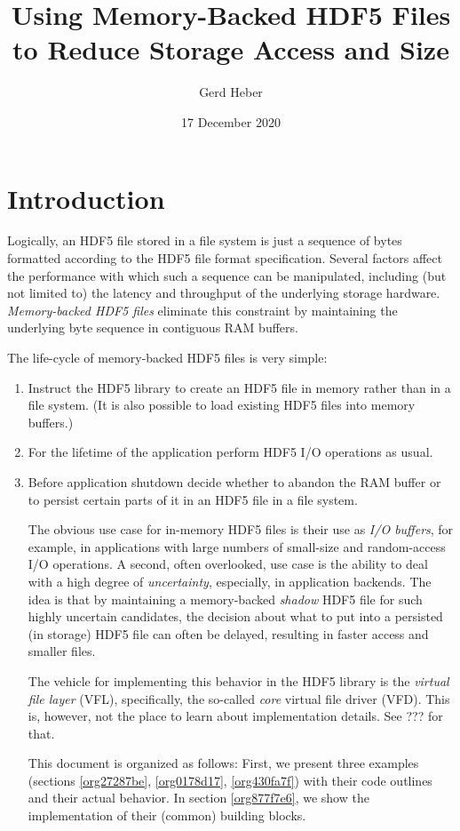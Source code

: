 \documentclass[a4paper, 12pt]{article}
\author{Gerd Heber}
\date{17 December 2020}
\title{Using Memory-Backed HDF5 Files to Reduce Storage Access and Size}
\begin{document}
\maketitle
\tableofcontents


\section{Introduction}
\label{sec:org0eadc57}

Logically, an HDF5 file stored in a file system is just a sequence of bytes
formatted according to the HDF5 file format specification. Several factors
affect the performance with which such a sequence can be manipulated,
including (but not limited to) the latency and throughput of the underlying
storage hardware. \emph{Memory-backed HDF5 files} eliminate this constraint by
maintaining the underlying byte sequence in contiguous RAM buffers.

The life-cycle of memory-backed HDF5 files is very simple:

\begin{enumerate}
\item Instruct the HDF5 library to create an HDF5 file in memory rather than in
a file system. (It is also possible to load existing HDF5 files into
memory buffers.)
\item For the lifetime of the application perform HDF5 I/O operations as usual.
\item Before application shutdown decide whether to abandon the RAM buffer or to
persist certain parts of it in an HDF5 file in a file system.

The obvious use case for in-memory HDF5 files is their use as \emph{I/O buffers},
for example, in applications with large numbers of small-size and
random-access I/O operations. A second, often overlooked, use case is the
ability to deal with a high degree of \emph{uncertainty}, especially, in
application backends. The idea is that by maintaining a memory-backed
\emph{shadow} HDF5 file for such highly uncertain candidates, the decision about
what to put into a persisted (in storage) HDF5 file can often be delayed,
resulting in faster access and smaller files.

The vehicle for implementing this behavior in the HDF5 library is the
\emph{virtual file layer} (VFL), specifically, the so-called \emph{core} virtual file
driver (VFD).  This is, however, not the place to learn about implementation
details. See ??? for that.

This document is organized as follows: First, we present three examples
(sections \ref{org27287be}, \ref{org0178d17}, \ref{org430fa7f}) with
their code outlines and their actual behavior. In section
\ref{org877f7e6}, we show the implementation of their (common) building
blocks.
\end{enumerate}
\end{document}
